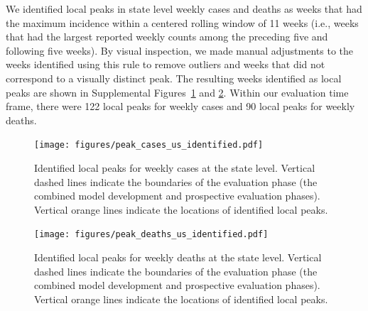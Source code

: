 \documentclass{article}
\begin{document}
We identified local peaks in state level weekly cases and deaths as weeks that had the maximum incidence within a centered rolling window of 11 weeks (i.e., weeks that had the largest reported weekly counts among the preceding five and following five weeks). By visual inspection, we made manual adjustments to the weeks identified using this rule to remove outliers and weeks that did not correspond to a visually distinct peak. The resulting weeks identified as local peaks are shown in Supplemental Figures~\ref{fig:peak_cases_us_identified} and \ref{fig:peak_deaths_us_identified}. Within our evaluation time frame, there were 122 local peaks for weekly cases and 90 local peaks for weekly deaths.

\begin{figure}
  \texttt{[image: figures/peak\_cases\_us\_identified.pdf]}
  \caption{Identified local peaks for weekly cases at the state level. Vertical dashed lines indicate the boundaries of the evaluation phase (the combined model development and prospective evaluation phases). Vertical orange lines indicate the locations of identified local peaks.}
  \label{fig:peak_cases_us_identified}
\end{figure}

\begin{figure}
  \texttt{[image: figures/peak\_deaths\_us\_identified.pdf]}
  \caption{Identified local peaks for weekly deaths at the state level. Vertical dashed lines indicate the boundaries of the evaluation phase (the combined model development and prospective evaluation phases). Vertical orange lines indicate the locations of identified local peaks.}
  \label{fig:peak_deaths_us_identified}
\end{figure}
\end{document}
